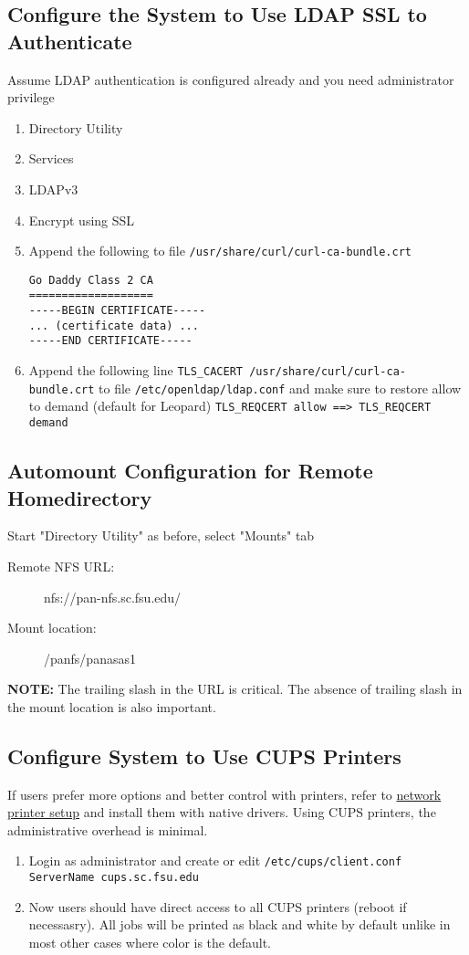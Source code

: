\documentclass[12pt,a4paper]{article}
\begin{document}
\subsection*{Configure the System to Use LDAP SSL to Authenticate}
Assume LDAP authentication is configured already and you need administrator privilege
\begin{enumerate}
    \item Directory Utility
    \item Services
    \item LDAPv3
    \item Encrypt using SSL
    \item Append the following to file \texttt{/usr/share/curl/curl-ca-bundle.crt}
    \begin{verbatim}
Go Daddy Class 2 CA
===================
-----BEGIN CERTIFICATE-----
... (certificate data) ...
-----END CERTIFICATE-----
    \end{verbatim}
    \item Append the following line
    \texttt{TLS\_CACERT /usr/share/curl/curl-ca-bundle.crt}
    to file \texttt{/etc/openldap/ldap.conf} and make sure to restore allow to demand (default for Leopard)
    \texttt{TLS\_REQCERT allow ==> TLS\_REQCERT demand}
\end{enumerate}

\subsection*{Automount Configuration for Remote Homedirectory}
Start "Directory Utility" as before, select "Mounts" tab
\begin{description}
    \item[Remote NFS URL:] nfs://pan-nfs.sc.fsu.edu/
    \item[Mount location:] /panfs/panasas1
\end{description}
\textbf{NOTE:} The trailing slash in the URL is critical. The absence of trailing slash in the mount location is also important.

\subsection*{Configure System to Use CUPS Printers}
If users prefer more options and better control with printers, refer to \href{https://www.sc.fsu.edu/computing/tech-docs/206-network-printer-setup}{network printer setup} and install them with native drivers. Using CUPS printers, the administrative overhead is minimal.
\begin{enumerate}
    \item Login as administrator and create or edit \texttt{/etc/cups/client.conf}
    \texttt{ServerName cups.sc.fsu.edu}
    \item Now users should have direct access to all CUPS printers (reboot if necessasry). All jobs will be printed as black and white by default unlike in most other cases where color is the default.
\end{enumerate}
\end{document}
